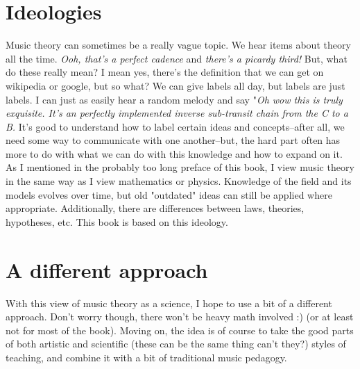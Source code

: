 \documentclass[../OpenAppliedMusicTheory.tex]{subfiles}
\begin{document}
    


    \section*{Ideologies}
    Music theory can sometimes be a really vague topic. We hear items about theory all the time. \emph{Ooh, that's a perfect cadence} and \emph{there's a picardy third!} But, what do these really mean? I mean yes, there's the definition that we can get on wikipedia or google, but so what? We can give labels all day, but labels are just labels. I can just as easily hear a random melody and say "\emph{Oh wow this is truly exquisite. It's an perfectly implemented inverse sub-transit chain from the C to a B.} It's good to understand how to label certain ideas and concepts--after all, we need some way to communicate with one another--but, the hard part often has more to do with what we can do with this knowledge and how to expand on it. As I mentioned in the probably too long preface of this book, I view music theory in the same way as I view mathematics or physics. Knowledge of the field and its models evolves over time, but old "outdated" ideas can still be applied where appropriate. Additionally, there are differences between laws, theories, hypotheses, etc. This book is based on this ideology. 

    \section*{A different approach}
    With this view of music theory as a science, I hope to use a bit of a different approach. Don't worry though, there won't be heavy math involved :) (or at least not for most of the book). Moving on, the idea is of course to take the good parts of both artistic and scientific (these can be the same thing can't they?) styles of teaching, and combine it with a bit of traditional music pedagogy.
    
\end{document}
